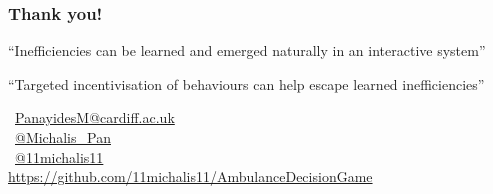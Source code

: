 \begin{frame}
    \frametitle{Thank you!}
    \centering

    \large
    ``Inefficiencies can be learned and emerged naturally in an interactive system''

    \vspace{0.5cm}

    ``Targeted incentivisation of behaviours can help escape learned inefficiencies''

    \vspace{1.5cm}
    \faEnvelope \, \url{PanayidesM@cardiff.ac.uk} \\
    \faTwitterSquare \, \url{@Michalis_Pan} \\
    \faGithubSquare \, \url{@11michalis11} \\
    \small{\url{https://github.com/11michalis11/AmbulanceDecisionGame}}

\end{frame}


